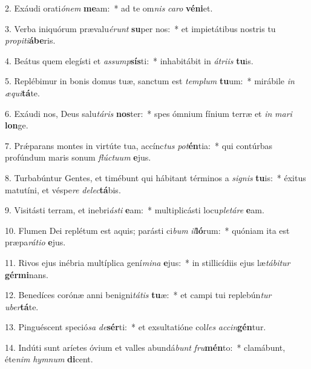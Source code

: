 2. Exáudi orati\textit{ó}\textit{nem} \textbf{me}am:~*  ad te om\textit{nis} \textit{ca}\textit{ro} \textbf{vé}\textbf{ni}et.\

3. Verba iniquórum prævalu\textit{é}\textit{runt} \textbf{su}per nos:~*  et impietátibus nostris tu \textit{pro}\textit{pi}\textit{ti}\textbf{á}\textbf{be}ris.\

4. Beátus quem elegísti et \textit{as}\textit{sump}\textbf{sís}ti:~*  inhabitábit in \textit{á}\textit{tri}\textit{is} \textbf{tu}is.\

5. Replébimur in bonis domus tuæ, sanctum est \textit{tem}\textit{plum} \textbf{tu}um:~*  mirábile \textit{in} \textit{æ}\textit{qui}\textbf{tá}te.\

6. Exáudi nos, Deus salu\textit{tá}\textit{ris} \textbf{nos}ter:~*  spes ómnium fínium terræ et \textit{in} \textit{ma}\textit{ri} \textbf{lon}ge.\

7. Prǽparans montes in virtúte tua, accínc\textit{tus} \textit{pot}\textbf{én}tia:~*  qui contúrbas profúndum maris sonum \textit{flúc}\textit{tu}\textit{um} \textbf{e}jus.\

8. Turbabúntur Gentes, et timébunt qui hábitant términos a \textit{si}\textit{gnis} \textbf{tu}is:~*  éxitus matutíni, et véspe\textit{re} \textit{de}\textit{lec}\textbf{tá}bis.\

9. Visitásti terram, et inebri\textit{ás}\textit{ti} \textbf{e}am:~*  multiplicásti locu\textit{ple}\textit{tá}\textit{re} \textbf{e}am.\

10. Flumen Dei replétum est aquis; parásti ci\textit{bum} \textit{il}\textbf{ló}rum:~*  quóniam ita est præpa\textit{rá}\textit{ti}\textit{o} \textbf{e}jus.\

11. Rivos ejus inébria multíplica gení\textit{mi}\textit{na} \textbf{e}jus:~*  in stillicídiis ejus læ\textit{tá}\textit{bi}\textit{tur} \textbf{gér}\textbf{mi}nans.\

12. Benedíces corónæ anni benigni\textit{tá}\textit{tis} \textbf{tu}æ:~*  et campi tui replebún\textit{tur} \textit{u}\textit{ber}\textbf{tá}te.\

13. Pinguéscent speció\textit{sa} \textit{de}\textbf{sér}ti:~*  et exsultatióne col\textit{les} \textit{ac}\textit{cin}\textbf{gén}tur.\

14. Indúti sunt aríetes óvium et valles abundá\textit{bunt} \textit{fru}\textbf{mén}to:~*  clamábunt, éte\textit{nim} \textit{hym}\textit{num} \textbf{di}cent.\

